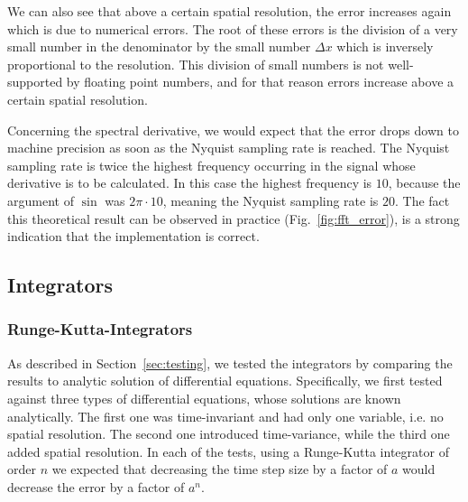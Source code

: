 We can also see that above a certain spatial resolution, the error increases again which is due to numerical errors.
The root of these errors is the division of a very small number in the denominator by the small number $\Delta x$ which is inversely proportional to the resolution.
This division of small numbers is not well-supported by floating point numbers, and for that reason errors increase above a certain spatial resolution.

Concerning the spectral derivative, we would expect that the error drops down to machine precision as soon as the Nyquist sampling rate is reached.
The Nyquist sampling rate is twice the highest frequency occurring in the signal whose derivative is to be calculated.
In this case the highest frequency is $10$, because the argument of $\sin$ was $2\pi\cdot 10$, meaning the Nyquist sampling rate is $20$.
The fact this theoretical result can be observed in practice (Fig.~\ref{fig:fft_error}), is a strong indication that the implementation is correct.


\FloatBarrier


\subsection{Integrators}
\subsubsection{Runge-Kutta-Integrators}
As described in Section~\ref{sec:testing}, we tested the integrators by comparing the results to analytic solution of differential equations.
Specifically, we first tested against three types of differential equations, whose solutions are known analytically.
The first one was time-invariant and had only one variable, i.e. no spatial resolution.
The second one introduced time-variance, while the third one added spatial resolution.
In each of the tests, using a Runge-Kutta integrator of order $n$ we expected that decreasing the time step size by a factor of $a$ would decrease the error by a factor of $a^n$.

